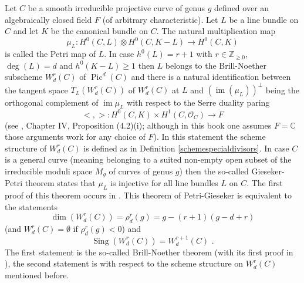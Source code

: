 \documentclass{article}
\DeclareMathOperator{\Pic}{Pic}
\DeclareMathOperator{\im}{im}
\DeclareMathOperator{\Sing}{Sing}
\theoremstyle{definition}
\theoremstyle{remark}
\begin{document}
Let $C$ be a smooth irreducible projective curve of genus $g$ defined over an algebraically closed field $F$ (of arbitrary characteristic).
Let $L$ be a line bundle on $C$ and let $K$ be the canonical bundle on $C$.
The natural multiplication map
\[
\mu _L : H^0(C,L) \otimes H^0(C,K-L) \rightarrow H^0(C,K)
\]
is called the Petri map of $L$.
In case $h^0(L)=r+1$ with $r \in \mathbb{Z}_{\geq 0}$, $\deg (L)=d$ and $h^0(K-L) \geq 1$ then $L$ belongs to the Brill-Noether subscheme $W^r_d(C)$ of $\Pic ^d(C)$ and there is a natural identification between the tangent space $T_L(W^r_d(C))$ of $W^r_d(C)$ at $L$ and $(\im (\mu _L))^{\perp}$ being the orthogonal complement of $\im \mu_L$ with respect to the Serre duality paring
\[
< , >: H^0(C,K) \times H^1(C,\mathcal{O}_C) \rightarrow F
\]
(see \cite{ref9}, Chapter IV, Proposition (4.2)(i); although in this book one assumes $F=\mathbb{C}$ those arguments work for any choice of $F$).
In this statement the scheme structure of $W^r_d(C)$ is defined as in Definition \ref{schemespecialdivisors}.
In case $C$ is a general curve (meaning belonging to a suited non-empty open subset of the irreducible moduli space $M_g$ of curves of genus $g$) then the so-called Gieseker-Petri theorem states that $\mu_L$ is injective for all line bundles $L$ on $C$.
The first proof of this theorem occurs in \cite{GIES}.
This theorem of Petri-Gieseker is equivalent to the statements
\[
\dim (W^r_d(C))=\rho ^r_d(g)=g-(r+1)(g-d+r)
\]
(and $W^r_d(C)=\emptyset$ if $\rho ^r_d(g)<0$) and
\[
\Sing (W^r_d(C))=W^{r+1}_d(C) \text { .}
\]
The first statement is the so-called Brill-Noether theorem (with its first proof in \cite {GHBNT}), the second statement is with respect to the scheme structure on $W^r_d(C)$ mentioned before.
\end{document}
